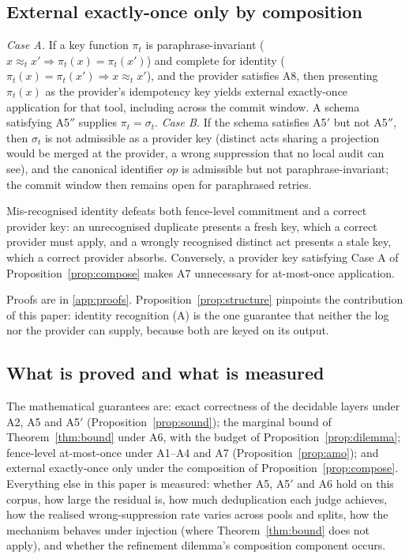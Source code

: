 \subsection{External exactly-once only by composition}\label{sec:compose}

\begin{proposition}\label{prop:compose}
\emph{Case A.} If a key function $\pi_t$ is paraphrase-invariant ($x\approx_t x'\Rightarrow\pi_t(x)=\pi_t(x')$) and complete for identity ($\pi_t(x)=\pi_t(x')\Rightarrow x\approx_t x'$), and the provider satisfies A8, then presenting $\pi_t(x)$ as the provider's idempotency key yields external exactly-once application for that tool, including across the commit window. A schema satisfying A5$''$ supplies $\pi_t=\sigma_t$.
\emph{Case B.} If the schema satisfies A5$'$ but not A5$''$, then $\sigma_t$ is not admissible as a provider key (distinct acts sharing a projection would be merged at the provider, a wrong suppression that no local audit can see), and the canonical identifier $\mathit{op}$ is admissible but not paraphrase-invariant; the commit window then remains open for paraphrased retries.
\end{proposition}

\begin{proposition}\label{prop:structure}
Mis-recognised identity defeats both fence-level commitment and a correct provider key: an unrecognised duplicate presents a fresh key, which a correct provider must apply, and a wrongly recognised distinct act presents a stale key, which a correct provider absorbs. Conversely, a provider key satisfying Case A of Proposition~\ref{prop:compose} makes A7 unnecessary for at-most-once application.
\end{proposition}

Proofs are in \ref{app:proofs}. Proposition~\ref{prop:structure} pinpoints the contribution of this paper: identity recognition (A) is the one guarantee that neither the log nor the provider can supply, because both are keyed on its output.

\subsection{What is proved and what is measured}

The mathematical guarantees are: exact correctness of the decidable layers under A2, A5 and A5$'$ (Proposition~\ref{prop:sound}); the marginal bound of Theorem~\ref{thm:bound} under A6, with the budget of Proposition~\ref{prop:dilemma}; fence-level at-most-once under A1--A4 and A7 (Proposition~\ref{prop:amo}); and external exactly-once only under the composition of Proposition~\ref{prop:compose}. Everything else in this paper is measured: whether A5, A5$'$ and A6 hold on this corpus, how large the residual is, how much deduplication each judge achieves, how the realised wrong-suppression rate varies across pools and splits, how the mechanism behaves under injection (where Theorem~\ref{thm:bound} does not apply), and whether the refinement dilemma's composition component occurs.
